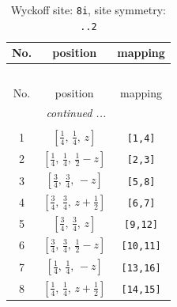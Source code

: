 \documentclass[fleqn,8pt]{jsarticle}
\begin{document}
\begin{longtable}{ccc}
\caption{Wyckoff site: {\tt 8i}, site symmetry: {\tt ..2}}
 \\
 \hline \hline
No. & position & mapping \\ \hline \endfirsthead

\multicolumn{2}{l}{\tablename\ \thetable{}} \\
 \hline \hline
No. & position & mapping \\ \hline \endhead

 \hline \hline
\multicolumn{2}{r}{\footnotesize\it continued ...} \\ \endfoot

 \hline \hline
\multicolumn{2}{r}{} \\ \endlastfoot

1 & $\left[ \frac{1}{4},\, \frac{1}{4},\, z \right]$ & {\tt [1,4]} \\ \hline
2 & $\left[ \frac{1}{4},\, \frac{1}{4},\, \frac{1}{2} - z \right]$ & {\tt [2,3]} \\ \hline
3 & $\left[ \frac{3}{4},\, \frac{3}{4},\, - z \right]$ & {\tt [5,8]} \\ \hline
4 & $\left[ \frac{3}{4},\, \frac{3}{4},\, z + \frac{1}{2} \right]$ & {\tt [6,7]} \\ \hline
5 & $\left[ \frac{3}{4},\, \frac{3}{4},\, z \right]$ & {\tt [9,12]} \\ \hline
6 & $\left[ \frac{3}{4},\, \frac{3}{4},\, \frac{1}{2} - z \right]$ & {\tt [10,11]} \\ \hline
7 & $\left[ \frac{1}{4},\, \frac{1}{4},\, - z \right]$ & {\tt [13,16]} \\ \hline
8 & $\left[ \frac{1}{4},\, \frac{1}{4},\, z + \frac{1}{2} \right]$ & {\tt [14,15]} \\
\end{longtable}
\renewcommand{\arraystretch}{1.2}
\end{document}
